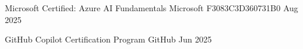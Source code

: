 

\begin{cvhonors}

  \cvhonor
    {Microsoft Certified: Azure AI Fundamentals} %
    {Microsoft} %
    {F3083C3D360731B0} %
    {Aug 2025} %

  \cvhonor
    {GitHub Copilot Certification Program} %
    {GitHub} %
    {} %
    {Jun 2025} %

\end{cvhonors}


